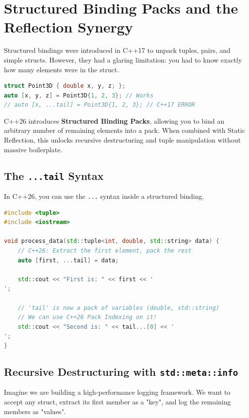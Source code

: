 \section{Structured Binding Packs and the Reflection Synergy}

Structured bindings were introduced in C++17 to unpack tuples, pairs, and simple structs. However, they had a glaring limitation: you had to know exactly how many elements were in the struct.

\begin{lstlisting}[language=C++]
struct Point3D { double x, y, z; };
auto [x, y, z] = Point3D{1, 2, 3}; // Works
// auto [x, ...tail] = Point3D{1, 2, 3}; // C++17 ERROR
\end{lstlisting}

C++26 introduces \textbf{Structured Binding Packs}, allowing you to bind an arbitrary number of remaining elements into a pack. When combined with Static Reflection, this unlocks recursive destructuring and tuple manipulation without massive boilerplate.

\subsection{The \texttt{...tail} Syntax}

In C++26, you can use the \texttt{...} syntax inside a structured binding.

\begin{lstlisting}[language=C++]
#include <tuple>
#include <iostream>

void process_data(std::tuple<int, double, std::string> data) {
    // C++26: Extract the first element, pack the rest
    auto [first, ...tail] = data;
    
    std::cout << "First is: " << first << '
';
    
    // 'tail' is now a pack of variables (double, std::string)
    // We can use C++26 Pack Indexing on it!
    std::cout << "Second is: " << tail...[0] << '
';
}
\end{lstlisting}

\subsection{Recursive Destructuring with \texttt{std::meta::info}}

Imagine we are building a high-performance logging framework. We want to accept any struct, extract its first member as a "key", and log the remaining members as "values".

